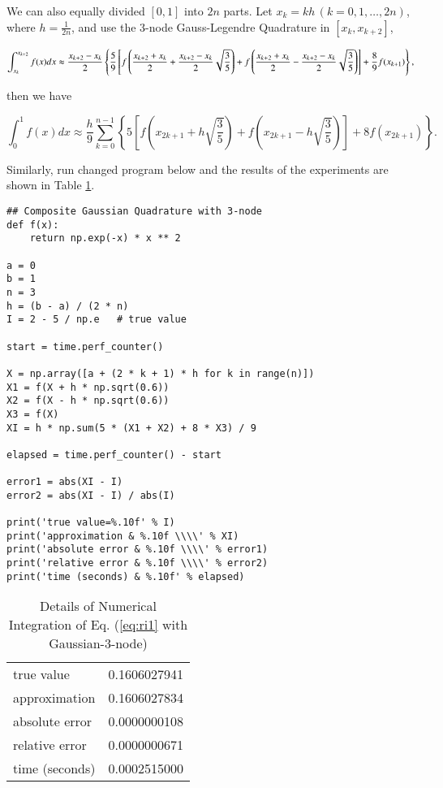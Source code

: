 \documentclass[preprint,12pt]{elsarticle}
\begin{document}
We can also equally divided $[0,1]$ into $2n$ parts. Let $x_{k}=kh\,(k=0,1,\dots,2n)$, where $h=\frac{1}{2n}$, and use the $3$-node Gauss-Legendre Quadrature in $[x_{k}, x_{k+2}]$,

\begin{dmath}
    \int_{x_k}^{x_{k+2}} f(x) dx \approx \frac{x_{k+2}-x_{k}}{2}\left\{ 
    \frac{5}{9} \left[
    f\left(\frac{x_{k+2}+x_{k}}{2} + \frac{x_{k+2}-x_{k}}{2}\sqrt{\frac{3}{5}}\right) + \\
    f\left(\frac{x_{k+2}+x_{k}}{2} - \frac{x_{k+2}-x_{k}}{2}\sqrt{\frac{3}{5}}\right)
    \right]+\frac{8}{9}f(x_{k+1})\right\},
\end{dmath}

then we have 

\begin{dmath}
    \int_{0}^{1} f(x) dx \approx \frac{h}{9}\sum_{k=0}^{n-1}\left\lbrace 5\left[f\left(x_{2k+1} + h\sqrt{\frac{3}{5}}\right) + f\left(x_{2k+1} - h\sqrt{\frac{3}{5}}\right)\right]+8f(x_{2k+1})\right\rbrace.
\end{dmath}

Similarly, run changed program below and the results of the experiments are shown in Table \ref{tab:cgq2}.

\begin{lstlisting}
## Composite Gaussian Quadrature with 3-node
def f(x):
    return np.exp(-x) * x ** 2

a = 0
b = 1
n = 3
h = (b - a) / (2 * n)
I = 2 - 5 / np.e   # true value

start = time.perf_counter()

X = np.array([a + (2 * k + 1) * h for k in range(n)])
X1 = f(X + h * np.sqrt(0.6))
X2 = f(X - h * np.sqrt(0.6))
X3 = f(X)
XI = h * np.sum(5 * (X1 + X2) + 8 * X3) / 9

elapsed = time.perf_counter() - start

error1 = abs(XI - I)
error2 = abs(XI - I) / abs(I)

print('true value=%.10f' % I)
print('approximation & %.10f \\\\' % XI)
print('absolute error & %.10f \\\\' % error1)
print('relative error & %.10f \\\\' % error2)
print('time (seconds) & %.10f' % elapsed)
\end{lstlisting}

\begin{table}[h]
\centering
\begin{tabular}{l|l}
\hline
true value & 0.1606027941 \\
approximation & 0.1606027834 \\
absolute error & 0.0000000108 \\
relative error & 0.0000000671 \\
time (seconds) & 0.0002515000
\end{tabular}
\caption{Details of Numerical Integration of Eq. (\ref{eq:ri1} with Gaussian-3-node)}
\label{tab:cgq2}
\end{table}
\end{document}
